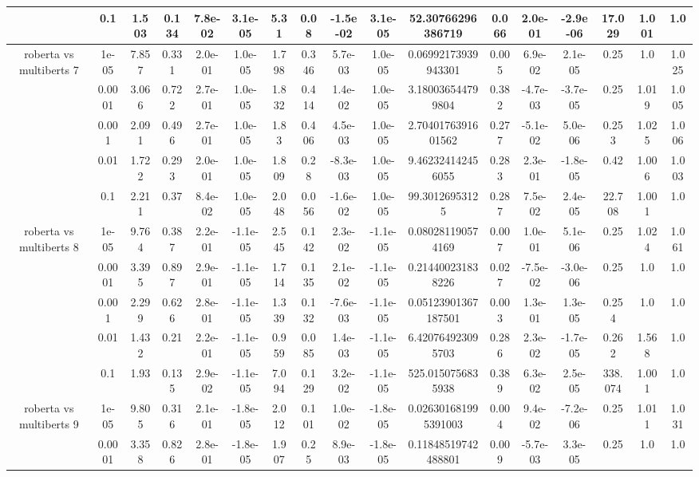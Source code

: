 \begin{tabular}{|c|c|c|c|c|c|c|c|c|c|c|c|c|c|c|c|c|}
 & 0.1 & 1.503 & 0.134 & 7.8e-02 & 3.1e-05 & 5.31 & 0.08 & -1.5e-02 & 3.1e-05 & 52.30766296386719 & 0.066 & 2.0e-01 & -2.9e-06 & 17.029 & 1.001 & 1.0 \\
\hline
\multirow{5}{*}{roberta  vs multiberts 7} & 1e-05 & 7.857 & 0.331 & 2.0e-01 & 1.0e-05 & 1.798 & 0.346 & 5.7e-03 & 1.0e-05 & 0.06992173939943301 & 0.005 & 6.9e-02 & 2.1e-05 & 0.25 & 1.0 & 1.025 \\
 & 0.0001 & 3.066 & 0.722 & 2.7e-01 & 1.0e-05 & 1.832 & 0.414 & 1.4e-02 & 1.0e-05 & 3.180036544799804 & 0.382 & -4.7e-03 & -3.7e-05 & 0.25 & 1.019 & 1.005 \\
 & 0.001 & 2.091 & 0.496 & 2.7e-01 & 1.0e-05 & 1.83 & 0.406 & 4.5e-03 & 1.0e-05 & 2.7040176391601562 & 0.277 & -5.1e-02 & 5.0e-06 & 0.253 & 1.025 & 1.006 \\
 & 0.01 & 1.722 & 0.293 & 2.0e-01 & 1.0e-05 & 1.809 & 0.28 & -8.3e-03 & 1.0e-05 & 9.462324142456055 & 0.283 & 2.3e-01 & -1.8e-05 & 0.42 & 1.006 & 1.003 \\
 & 0.1 & 2.211 & 0.37 & 8.4e-02 & 1.0e-05 & 2.048 & 0.056 & -1.6e-02 & 1.0e-05 & 99.30126953125 & 0.287 & 7.5e-02 & 2.4e-05 & 22.708 & 1.001 & 1.0 \\
\hline
\multirow{5}{*}{roberta  vs multiberts 8} & 1e-05 & 9.764 & 0.387 & 2.2e-01 & -1.1e-05 & 2.545 & 0.142 & 2.3e-02 & -1.1e-05 & 0.080281190574169 & 0.007 & 1.0e-01 & 5.1e-06 & 0.25 & 1.024 & 1.061 \\
 & 0.0001 & 3.395 & 0.897 & 2.9e-01 & -1.1e-05 & 1.714 & 0.135 & 2.1e-02 & -1.1e-05 & 0.214400231838226 & 0.027 & -7.5e-02 & -3.0e-06 & 0.25 & 1.0 & 1.0 \\
 & 0.001 & 2.299 & 0.626 & 2.8e-01 & -1.1e-05 & 1.339 & 0.132 & -7.6e-03 & -1.1e-05 & 0.05123901367187501 & 0.003 & 1.3e-01 & 1.3e-05 & 0.254 & 1.0 & 1.0 \\
 & 0.01 & 1.432 & 0.21 & 2.2e-01 & -1.1e-05 & 0.959 & 0.085 & 1.4e-03 & -1.1e-05 & 6.420764923095703 & 0.286 & 2.3e-02 & -1.7e-05 & 0.262 & 1.568 & 1.0 \\
 & 0.1 & 1.93 & 0.135 & 2.9e-02 & -1.1e-05 & 7.094 & 0.129 & 3.2e-02 & -1.1e-05 & 525.0150756835938 & 0.389 & 6.3e-02 & 2.5e-05 & 338.074 & 1.001 & 1.0 \\
\hline
\multirow{5}{*}{roberta  vs multiberts 9} & 1e-05 & 9.805 & 0.316 & 2.1e-01 & -1.8e-05 & 2.012 & 0.101 & 1.0e-02 & -1.8e-05 & 0.026301681995391003 & 0.004 & 9.4e-02 & -7.2e-06 & 0.25 & 1.011 & 1.031 \\
 & 0.0001 & 3.358 & 0.826 & 2.8e-01 & -1.8e-05 & 1.907 & 0.25 & 8.9e-03 & -1.8e-05 & 0.11848519742488801 & 0.009 & -5.7e-03 & 3.3e-05 & 0.25 & 1.0 & 1.0 \\

\end{tabular}
